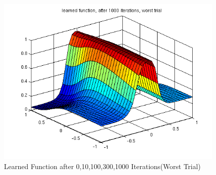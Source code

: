 \begin{figure}[hp!]
\begin{center}
\begin{minipage}{0.48\textwidth}
 \includegraphics[width=0.99\textwidth]{./figures/1/learned_worst_1000}
 \end{minipage}
 \caption{Learned Function after 0,10,100,300,1000 Iterations(Worst Trial)}
\label{fig:learned_function_worst}
\end{center}
\end{figure}

